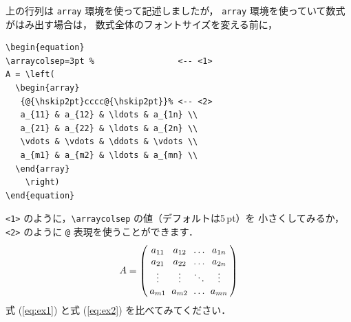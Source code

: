 \documentclass[technicalreport]{ieicej}
\begin{document}
上の行列は \texttt{array} 環境を使って記述しましたが，
\texttt{array} 環境を使っていて数式がはみ出す場合は，
数式全体のフォントサイズを変える前に，
\begin{verbatim}
\begin{equation}
\arraycolsep=3pt %                 <-- <1>
A = \left(
  \begin{array}
   {@{\hskip2pt}cccc@{\hskip2pt}}% <-- <2> 
   a_{11} & a_{12} & \ldots & a_{1n} \\
   a_{21} & a_{22} & \ldots & a_{2n} \\
   \vdots & \vdots & \ddots & \vdots \\
   a_{m1} & a_{m2} & \ldots & a_{mn} \\
  \end{array}
    \right) 
\end{equation}
\end{verbatim}
\texttt{<1>} のように，\verb/\arraycolsep/ の値（デフォルトは5\,pt）を
小さくしてみるか，
\texttt{<2>} のように \texttt{@} 表現を使うことができます．
\begin{equation}
\arraycolsep=3pt
A = \left(
  \begin{array}{@{\hskip2pt}cccc@{\hskip2pt}}
   a_{11} & a_{12} & \ldots & a_{1n} \\
   a_{21} & a_{22} & \ldots & a_{2n} \\
   \vdots & \vdots & \ddots & \vdots \\
   a_{m1} & a_{m2} & \ldots & a_{mn} \\
  \end{array}
    \right)
 \label{eq:ex2}
\end{equation}
式 (\ref{eq:ex1}) と式 (\ref{eq:ex2}) を比べてみてください．

\halflineskip
\end{document}
